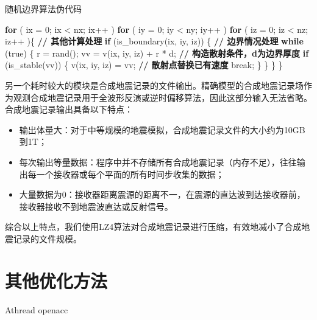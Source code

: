 \documentclass[degree=doctor]{thuthesis}
\begin{document}
\begin{algorithm}[ht]
\small
\caption{随机边界算法伪代码}\label{alg:randomboundary}
\begin{algorithmic}[1]
\State \textbf{for} ( ix = 0; ix < nx; ix++ )
\State \quad\quad \textbf{for} ( iy = 0; iy < ny; iy++ )
\State \quad\quad\quad\quad \textbf{for} ( iz = 0; iz < nz; iz++ )\{
\State \quad\quad\quad\quad\quad\quad \textbf{// 其他计算处理}
\State \quad\quad\quad\quad\quad\quad \textbf{if} (is\_boundary(ix, iy, iz)) \{ \textbf{// 边界情况处理}
\State \quad\quad\quad\quad\quad\quad\quad\quad \textbf{while} (true) \{ \label{ln:randbegin}
\State \quad\quad\quad\quad\quad\quad\quad\quad\quad\quad r = rand();
\State \quad\quad\quad\quad\quad\quad\quad\quad\quad\quad vv = v(ix, iy, iz) + r * d; \textbf{// 构造散射条件，d为边界厚度}
\State \quad\quad\quad\quad\quad\quad\quad\quad\quad\quad \textbf{if} (is\_stable(vv)) \{
\State \quad\quad\quad\quad\quad\quad\quad\quad\quad\quad\quad\quad v(ix, iy, iz) = vv; \textbf{// 散射点替换已有速度}
\State \quad\quad\quad\quad\quad\quad\quad\quad\quad\quad\quad\quad break;
\State \quad\quad\quad\quad\quad\quad\quad\quad\quad\quad \}
\State \quad\quad\quad\quad\quad\quad\quad\quad \} \label{ln:randend}
\State \quad\quad\quad\quad\quad\quad \}
\State \quad\quad\quad\quad \}
\end{algorithmic}
\end{algorithm}

另一个耗时较大的模块是合成地震记录的文件输出。精确模型的合成地震记录场作为观测合成地震记录用于全波形反演或逆时偏移算法，因此这部分输入无法省略。合成地震记录输出具备以下特点：
\begin{itemize}
  \item 输出体量大：对于中等规模的地震模拟，合成地震记录文件的大小约为10GB到1T；
  \item 每次输出等量数据：程序中并不存储所有合成地震记录（内存不足），往往输出每一个接收器或每个平面的所有时间步收集的数据；
  \item 大量数据为0：接收器距离震源的距离不一，在震源的直达波到达接收器前，接收器接收不到地震波直达或反射信号。
\end{itemize}
综合以上特点，我们使用LZ4算法对合成地震记录进行压缩，有效地减小了合成地震记录的文件规模。


\section{其他优化方法} %
\label{sec:其他优化方法}
Athread
openacc
\end{document}

